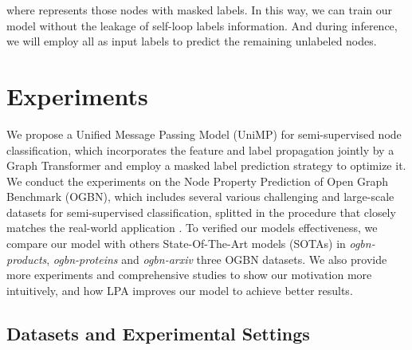 \documentclass{article} \usepackage{iclr2021_conference,times}
\begin{document}
where  represents those nodes with masked labels. In this way, we can train our model without the leakage of self-loop labels information. And during inference, we will employ all  as input labels to predict the remaining unlabeled nodes.






\section{Experiments}

We propose a Unified Message Passing Model (UniMP) for semi-supervised node classification, which incorporates the feature and label propagation jointly by a Graph Transformer and employ a masked label prediction strategy to optimize it. We conduct the experiments on the Node Property Prediction of Open Graph Benchmark (OGBN), which includes several various challenging and large-scale datasets for semi-supervised classification, splitted in the procedure that closely matches the real-world application \cite{hu2020open}. To verified our models effectiveness, we compare our model with others State-Of-The-Art models (SOTAs) in \emph{ogbn-products}, \emph{ogbn-proteins} and \emph{ogbn-arxiv} three OGBN datasets. We also provide more experiments and comprehensive studies to show our motivation more intuitively, and how LPA improves our model to achieve better results.


\subsection{Datasets and Experimental Settings}

\begin{table}[htbp]
	\setlength{\abovecaptionskip}{0.cm}
	\setlength{\belowcaptionskip}{-.2cm}
	\caption{Dataset statistics of OGB node property prediction}
    \small
	\begin{center}
	\end{center}
	\label{table:ogb}
\end{table}
\end{document}
